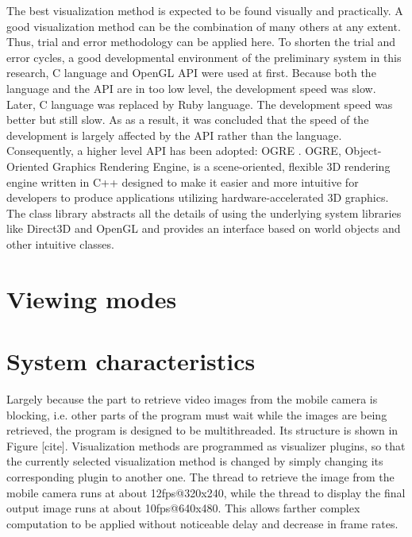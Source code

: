 The best visualization method is expected to be found visually and practically. A good visualization method can be the combination of many others at any extent. Thus, trial and error methodology can be applied here. To shorten the trial and error cycles, a good developmental environment of the preliminary system in this research, C language and OpenGL API \citep{Reference10} were used at first. Because both the language and the API are in too low level, the development speed was slow. Later, C language was replaced by Ruby language. The development speed was better but still slow. As as a result, it was concluded that the speed of the development is largely affected by the API rather than the language. Consequently, a higher level API has been adopted: OGRE \citep{Reference11}. OGRE, Object-Oriented Graphics Rendering Engine, is a scene-oriented, flexible 3D rendering engine written in C++ designed to make it easier and more intuitive for developers to produce applications utilizing hardware-accelerated 3D graphics. The class library abstracts all the details of using the underlying system libraries like Direct3D and OpenGL and provides an interface based on world objects and other intuitive classes.

\section{Viewing modes}

\section{System characteristics}

Largely because the part to retrieve video images from the mobile camera is blocking, i.e. other parts of the program must wait while the images are being retrieved, the program is designed to be multithreaded. Its structure is shown in Figure [cite]. Visualization methods are programmed as visualizer plugins, so that the currently selected visualization method is changed by simply changing its corresponding plugin to another one. The thread to retrieve the image from the mobile camera runs at about 12fps@320x240, while the thread to display the final output image runs at about 10fps@640x480. This allows farther complex computation to be applied without noticeable delay and decrease in frame rates.
